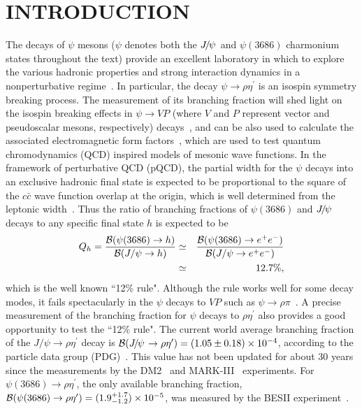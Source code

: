 \documentclass[twocolumn,showpacs,aps,prd]{revtex4-1}
\newcommand{\etap}{\eta^{\prime}}
\newcommand{\psip}{\psi(3686)}
\newcommand{\jpsirho}{J/\psi\rightarrow \rho \etap}
\begin{document}
\section{\boldmath INTRODUCTION}
The decays of $\psi$ mesons ($\psi$ denotes both the ${J\mskip -3mu/\mskip -2mu\psi\mskip 2mu}$ and $\psip$ charmonium states throughout the text) provide an excellent laboratory in which to explore the various hadronic properties and strong interaction dynamics in a nonperturbative regime~\cite{BESIIIBOOK}. In particular, the decay
$\psi \to \rho\eta^\prime$ is an isospin symmetry breaking process. The measurement of its branching fraction will shed
light on the isospin breaking effects in $\psi \to VP$ (where $V$ and $P$ represent vector and pseudoscalar mesons, respectively) decays~\cite{qianwang}, and can be also used to calculate
the associated electromagnetic form factors~\cite{Brodsky}, which are used to test quantum chromodynamics (QCD) inspired models of
mesonic wave functions. In the framework of perturbative QCD (pQCD), the partial width for the $\psi$ decays into
an exclusive hadronic final state is expected to be proportional to the square of the $c\bar{c}$ wave function overlap at the origin,
which is well determined from the leptonic width~\cite{trule}.
Thus the ratio of branching fractions of $\psip$ and ${J\mskip -3mu/\mskip -2mu\psi\mskip 2mu}$ decays to any specific final state $h$ is expected to be
%
\begin{eqnarray}
  \label{Q12}
  Q_h = \frac{{\cal B}(\psip\to h)}{{\cal B}(J/\psi\to h)} \simeq &&  \frac{{\cal B}(\psip\to e^+e^-)}
  {{\cal B}(J/\psi\to e^+e^-)} \nonumber\\
   \simeq&& 12.7\%,
\end{eqnarray}
%
which is the well known ``12\% rule". Although the rule works well for some decay modes, it fails spectacularly
in the $\psi$ decays to $VP$ \cite{Brodsky,vpsuppress2} such as $\psi \to \rho\pi$~\cite{rhopipuzzle}.
A precise measurement of the branching fraction for $\psi$ decays to $\rho\eta^\prime$ also provides a good opportunity to test the ``12\% rule". The current world average branching fraction of the $\jpsirho$ decay is $\mathcal{B}(\jpsi\to\rho\etap)=(1.05\pm0.18)\times 10^{-4}$, according to the particle data group (PDG)~\cite{pdg}. This value has not been updated for about 30 years since the measurements by the DM2~\cite{DM2} and MARK-III~\cite{MARKIII} experiments.
 For $\psip\to \rho\eta^\prime$, the only available branching fraction, ${\cal B}(\psip \to \rho\eta^\prime) = (1.9^{+1.7}_{-1.2})\times 10^{-5}$, was measured by the BESII experiment~\cite{BESpsip}.
\end{document}
